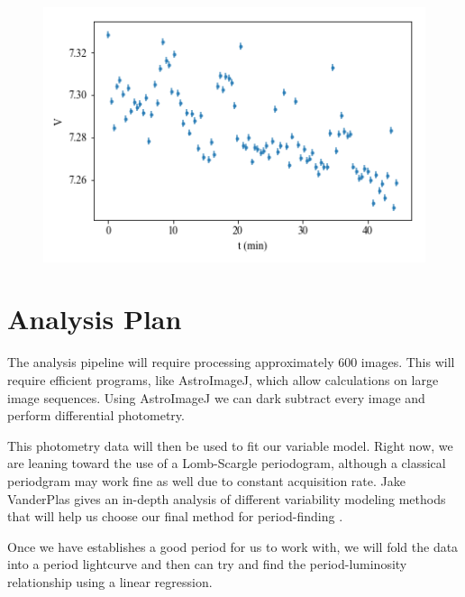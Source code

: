 \documentclass[]{article}
\begin{document}
	\begin{figure}[p]
		\includegraphics[width=\linewidth]{figs/mags.png}
		\caption{}
		\label{fig:mags}
	\end{figure}

\section{Analysis Plan}

	The analysis pipeline will require processing approximately 600 images. This will require efficient programs, like AstroImageJ, which allow calculations on large image sequences. Using AstroImageJ we can dark subtract every image and perform differential photometry. 
	
	This photometry data will then be used to fit our variable model. Right now, we are leaning toward the use of a Lomb-Scargle periodogram, although a classical periodgram may work fine as well due to constant acquisition rate. Jake VanderPlas gives an in-depth analysis of different variability modeling methods that will help us choose our final method for period-finding \cite{2017arXiv170309824V}.
	
	Once we have establishes a good period for us to work with, we will fold the data into a period lightcurve and then can try and find the period-luminosity relationship using a linear regression.


%
%
\end{document}
